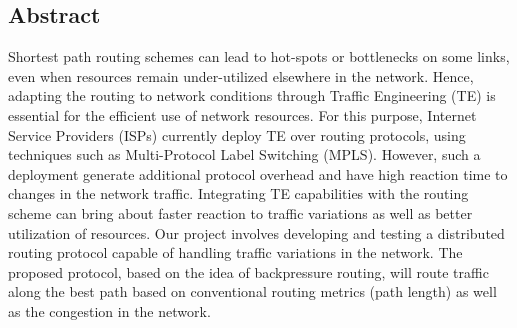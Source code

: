 \label{sec:abstract}
\begin{center}
\section*{Abstract}
\end{center}

Shortest path routing schemes can lead to hot-spots or bottlenecks on some links, even when resources remain under-utilized elsewhere in the network. Hence, adapting the routing to network conditions through Traffic Engineering (TE) is essential for the efficient use of network resources. For this purpose, Internet Service Providers (ISPs) currently deploy TE over routing protocols, using techniques such as Multi-Protocol Label Switching (MPLS). However, such a deployment generate additional protocol overhead and have high reaction time to changes in the network traffic. Integrating TE capabilities with the routing scheme can bring about faster reaction to traffic variations as well as better utilization of resources. Our project involves developing and testing a distributed routing protocol capable of handling traffic variations in the network. The proposed protocol, based on the idea of backpressure routing, will route traffic along the best path based on conventional routing metrics (path length) as well as the congestion in the network.
